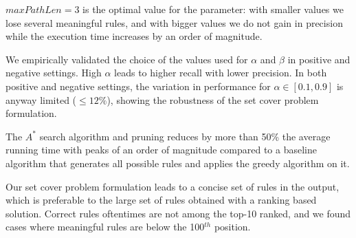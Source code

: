 \noindent {} $maxPathLen=3$ is the optimal value for the parameter: with smaller values we lose several meaningful rules, and with bigger values we do not gain in precision while  the execution time increases by an order of magnitude. %

\noindent {} We empirically validated the choice of the values used for $\alpha$ and $\beta$ in positive and negative settings. High $\alpha$ leads to higher recall with lower precision. In both positive and negative settings, the variation in performance for $\alpha \in [0.1,0.9]$ is anyway limited ($\leq 12\%$), showing the robustness of the set cover problem formulation.

\noindent {} The $A^*$ search algorithm and pruning reduces by more than 50\% the average running time with peaks of an order of magnitude compared to a baseline algorithm that generates all possible rules and applies the greedy algorithm on it.

\noindent {} Our set cover problem formulation leads to a concise set of rules in the output, which is preferable to the large set of rules obtained with a ranking based solution. Correct rules oftentimes are not among the top-10 ranked, and we found cases where meaningful rules are below the 100$^{th}$ position.
	

